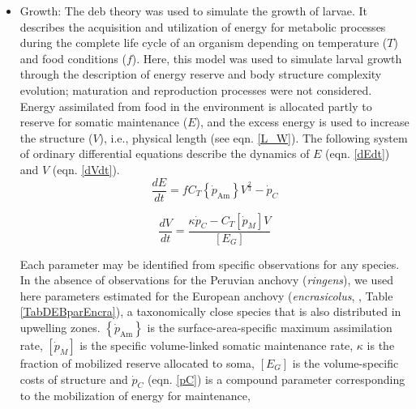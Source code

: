 \begin{itemize}

\item Growth: The \acrshort{deb} theory \citep{Kooi2009} was used to simulate the growth of larvae. It describes the acquisition and utilization of energy for metabolic processes during the complete life cycle of an organism depending on temperature ($T$) and food conditions ($f$). Here, this model was used to simulate larval growth through the description of energy reserve and body structure complexity evolution; maturation and reproduction processes were not considered. Energy assimilated from food in the environment is allocated partly to reserve for somatic maintenance ($E$), and the excess energy is used to increase the structure ($V$), i.e., physical length (see eqn. \ref{L_W}). The following system of ordinary differential equations describe the dynamics of $E$ (eqn. \ref{dEdt}) and $V$ (eqn. \ref{dVdt}).\\

\begin{equation}
	\frac{dE}{dt} = f C_{T} \left \{ \dot{p}_\mathrm{Am} \right \} V^{\frac{2}{3}} - \dot{p}_{C}
	\label{dEdt}
\end{equation}

\begin{equation}
	\frac{dV}{dt} = \frac
						{\kappa \dot{p}_C - C_{T} \left [ \dot{p}_{M} \right ] V}
						{\left [ E_{G} \right ]}
	\label{dVdt}
\end{equation}

Each parameter may be identified from specific observations for any species. In the absence of observations for the Peruvian anchovy (\textit{\gls{ringens}}), we used here parameters estimated for the European anchovy (\textit{\gls{encrasicolus}}, \cite{PethRoos2013}	, Table \ref{TabDEBparEncra}), a taxonomically close species that is also distributed in upwelling zones. $\left \{ \dot{p}_\mathrm{Am} \right \}$ is the surface-area-specific maximum assimilation rate, $\left [ \dot{p}_{M} \right ]$ is the specific volume-linked somatic maintenance rate, $\kappa$ is the fraction of mobilized reserve allocated to soma, ${\left [ E_{G} \right ]}$ is the volume-specific costs of structure and $\dot{p}_{C}$ (eqn. \ref{pC}) is a compound parameter corresponding to the mobilization of energy for maintenance,\\


\end{itemize}
